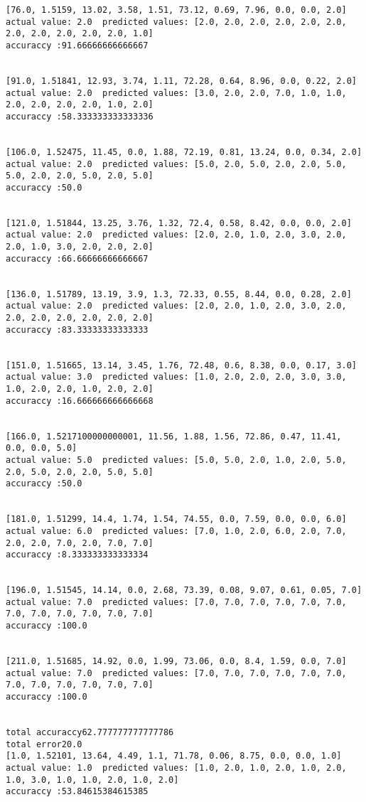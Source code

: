 \documentclass[11pt]{article}
\begin{document}
\begin{Verbatim}[commandchars=\\\{\}]
[76.0, 1.5159, 13.02, 3.58, 1.51, 73.12, 0.69, 7.96, 0.0, 0.0, 2.0]
actual value: 2.0  predicted values: [2.0, 2.0, 2.0, 2.0, 2.0, 2.0, 2.0, 2.0, 2.0, 2.0, 2.0, 1.0]
accuraccy :91.66666666666667


[91.0, 1.51841, 12.93, 3.74, 1.11, 72.28, 0.64, 8.96, 0.0, 0.22, 2.0]
actual value: 2.0  predicted values: [3.0, 2.0, 2.0, 7.0, 1.0, 1.0, 2.0, 2.0, 2.0, 2.0, 1.0, 2.0]
accuraccy :58.333333333333336


[106.0, 1.52475, 11.45, 0.0, 1.88, 72.19, 0.81, 13.24, 0.0, 0.34, 2.0]
actual value: 2.0  predicted values: [5.0, 2.0, 5.0, 2.0, 2.0, 5.0, 5.0, 2.0, 2.0, 5.0, 2.0, 5.0]
accuraccy :50.0


[121.0, 1.51844, 13.25, 3.76, 1.32, 72.4, 0.58, 8.42, 0.0, 0.0, 2.0]
actual value: 2.0  predicted values: [2.0, 2.0, 1.0, 2.0, 3.0, 2.0, 2.0, 1.0, 3.0, 2.0, 2.0, 2.0]
accuraccy :66.66666666666667


[136.0, 1.51789, 13.19, 3.9, 1.3, 72.33, 0.55, 8.44, 0.0, 0.28, 2.0]
actual value: 2.0  predicted values: [2.0, 2.0, 1.0, 2.0, 3.0, 2.0, 2.0, 2.0, 2.0, 2.0, 2.0, 2.0]
accuraccy :83.33333333333333


[151.0, 1.51665, 13.14, 3.45, 1.76, 72.48, 0.6, 8.38, 0.0, 0.17, 3.0]
actual value: 3.0  predicted values: [1.0, 2.0, 2.0, 2.0, 3.0, 3.0, 1.0, 2.0, 2.0, 1.0, 2.0, 2.0]
accuraccy :16.666666666666668


[166.0, 1.5217100000000001, 11.56, 1.88, 1.56, 72.86, 0.47, 11.41, 0.0, 0.0, 5.0]
actual value: 5.0  predicted values: [5.0, 5.0, 2.0, 1.0, 2.0, 5.0, 2.0, 5.0, 2.0, 2.0, 5.0, 5.0]
accuraccy :50.0


[181.0, 1.51299, 14.4, 1.74, 1.54, 74.55, 0.0, 7.59, 0.0, 0.0, 6.0]
actual value: 6.0  predicted values: [7.0, 1.0, 2.0, 6.0, 2.0, 7.0, 2.0, 2.0, 7.0, 2.0, 7.0, 7.0]
accuraccy :8.333333333333334


[196.0, 1.51545, 14.14, 0.0, 2.68, 73.39, 0.08, 9.07, 0.61, 0.05, 7.0]
actual value: 7.0  predicted values: [7.0, 7.0, 7.0, 7.0, 7.0, 7.0, 7.0, 7.0, 7.0, 7.0, 7.0, 7.0]
accuraccy :100.0


[211.0, 1.51685, 14.92, 0.0, 1.99, 73.06, 0.0, 8.4, 1.59, 0.0, 7.0]
actual value: 7.0  predicted values: [7.0, 7.0, 7.0, 7.0, 7.0, 7.0, 7.0, 7.0, 7.0, 7.0, 7.0, 7.0]
accuraccy :100.0


total accuraccy62.777777777777786
total error20.0
[1.0, 1.52101, 13.64, 4.49, 1.1, 71.78, 0.06, 8.75, 0.0, 0.0, 1.0]
actual value: 1.0  predicted values: [1.0, 2.0, 1.0, 2.0, 1.0, 2.0, 1.0, 3.0, 1.0, 1.0, 2.0, 1.0, 2.0]
accuraccy :53.84615384615385



\end{Verbatim}
\end{document}
